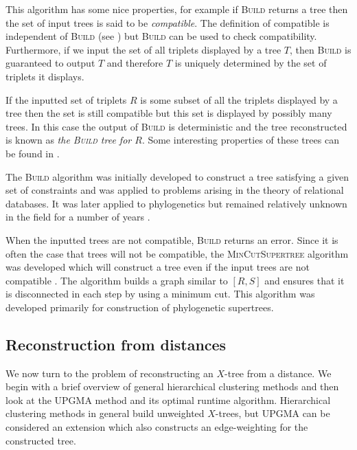 This algorithm has some nice properties, for example if \textsc{Build} returns
a tree then the set of input trees is said to be \textit{compatible}.  The
definition of compatible is independent of \textsc{Build} (see
\cite{semple2003phylogenetics}) but \textsc{Build} can be used to check
compatibility.  Furthermore, if we input the set of all triplets displayed by
a tree $T$, then \textsc{Build} is guaranteed to output $T$ and therefore $T$
is uniquely determined by the set of triplets it displays.

If the inputted set of triplets $R$ is some subset of all the triplets
displayed by a tree then the set is still compatible but this set is displayed
by possibly many trees.  In this case the output of \textsc{Build} is
deterministic and the tree reconstructed is known as \textit{the
  \textsc{Build} tree for $R$}.  Some interesting properties of these trees
can be found in \cite[Section 2.5.2]{bryant97buildingtrees}.

The \textsc{Build} algorithm was initially developed to construct a tree
satisfying a given set of constraints and was applied to problems arising in
the theory of relational databases.  It was later applied to phylogenetics but
remained relatively unknown in the field for a number of years
\cite{steel1992complexity,bryant04supertree}.

When the inputted trees are not compatible, \textsc{Build} returns an error.
Since it is often the case that trees will not be compatible, the
\textsc{MinCutSupertree} algorithm was developed which will construct a tree
even if the input trees are not compatible \cite{semple2000supertree}.
The algorithm builds a graph similar to $[R,S]$ and ensures that it is
disconnected in each step by using a minimum cut.  This algorithm was
developed primarily for construction of phylogenetic supertrees.

\subsection{Reconstruction from distances}
\label{sec:constr-from-dist}

We now turn to the problem of reconstructing an $X$-tree from a distance.  We
begin with a brief overview of general hierarchical clustering methods and
then look at the UPGMA method \cite{sokal1958statistical} and its optimal
runtime algorithm.  Hierarchical clustering methods in general build
unweighted $X$-trees, but UPGMA can be considered an extension which also
constructs an edge-weighting for the constructed tree.

